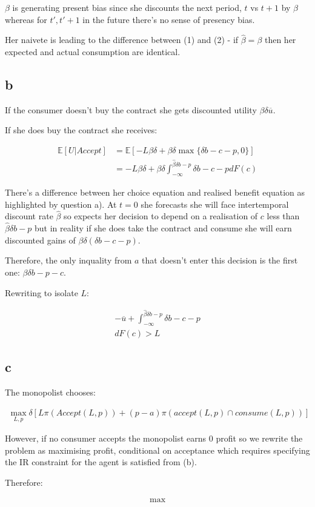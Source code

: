 \documentclass{article}
\begin{document}
$\beta$ is generating present bias since she discounts the next period, $t$ vs 
$t+1$ by $\beta$ whereas for $t', t'+1$ in the future there's no sense of 
presency bias.


Her naivete is leading to the difference between (1) and (2) - if $\hat{\beta} = \beta$
then her expected and actual consumption are identical.


\subsection*{b}


If the consumer doesn't buy the contract she gets discounted utility $\beta \delta \overline{u}$.

If she does buy the contract she receives:

\begin{align*}
    \mathbb{E}[U | \textit{Accept}] &= \mathbb{E}\left[ 
        -L\beta \delta + \beta \delta \max\{\delta b - c - p, 0\} 
    \right] \\
    &= -L \beta \delta + \beta \delta \int^{\hat{\beta}\delta b - p}_{-\infty} \delta b - c - p dF(c)
\end{align*}


There's a difference between her choice equation and realised benefit equation as 
highlighted by question a). At $t=0$ she forecasts she will face intertemporal 
discount rate $\hat{\beta}$ so expects her decision to depend on a realisation of 
$c$ less than $\hat{\beta}\delta b - p$ but in reality if she does take the 
contract and consume she will earn discounted gains of $\beta \delta (\delta b - c - p)$. 



Therefore, the only inquality from $a$ that doesn't enter this decision is the 
first one: $\beta \delta b - p - c$.


Rewriting to isolate $L$:

\begin{align*}
    - \overline{u} + \int^{\hat{\beta}\delta b - p}_{-\infty} \delta b - c - p \\ dF(c) > L
\end{align*}

\subsection*{c}


The monopolist chooses:

\begin{align*}
    \max_{L,p} \delta \left[ L \pi(\textit{Accept}(L, p)) + (p - a) \pi(\textit{accept}(L, p) \cap \textit{consume}(L, p)) \right]
\end{align*}


However, if no consumer accepts the monopolist earns 0 profit so we rewrite the 
problem as maximising profit, conditional on acceptance which requires 
specifying the IR constraint for the agent is satisfied from (b).


Therefore:

\begin{align*}
    \max
\end{align*}
\end{document}
